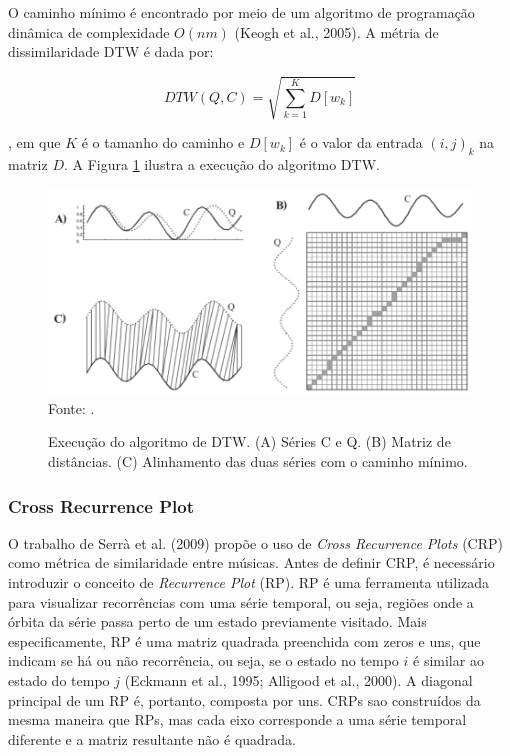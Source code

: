 O caminho mínimo é encontrado por meio de um algoritmo de programação dinâmica de complexidade \({O(nm)}\) (Keogh et al., 2005). A métria de dissimilaridade DTW é dada por:

\begin{equation}
    DTW(Q,C) = \sqrt{\sum_{k=1}^{K} D[w_{k}]}
\end{equation}

, em que \({K}\) é o tamanho do caminho e \({D[w_{k}]}\) é o valor da entrada \({(i,j)_{k}}\) na matriz \({D}\). A Figura \ref{fig:dtw} ilustra a execução do algoritmo DTW.

\begin{figure}[!htb]
   \centering
   \caption{Execução do algoritmo de DTW. (A) Séries C e Q. (B) Matriz de distâncias. (C) Alinhamento das duas séries com o caminho mínimo.}\label{fig:dtw} 
   \includegraphics[scale=0.47]{figuras/dtw.png}
   Fonte: \cite{ono2015}.
\end{figure}

\subsubsection{Cross Recurrence Plot}

O trabalho de Serrà et al. (2009) propõe o uso de \textit{Cross Recurrence Plots} (CRP) como métrica de similaridade entre músicas. Antes de definir CRP, é necessário introduzir o conceito de \textit{Recurrence Plot} (RP). RP é uma ferramenta utilizada para visualizar recorrências com uma série temporal, ou seja, regiões onde a órbita da série passa perto de um estado previamente visitado. Mais especificamente, RP é uma matriz quadrada preenchida com zeros e uns, que indicam se há ou não recorrência, ou seja, se o estado no tempo \({i}\) é similar ao estado do tempo \({j}\) (Eckmann et al., 1995; Alligood et al., 2000). A diagonal principal de um RP é, portanto, composta por uns. CRPs sao construídos da mesma maneira que RPs, mas cada eixo corresponde a uma série temporal diferente e a matriz resultante não é quadrada.

